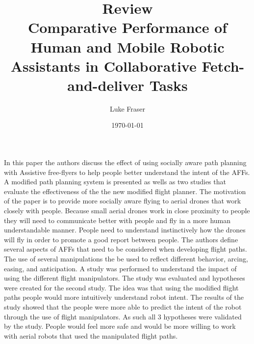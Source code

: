 \documentclass{article}
\begin{document}
\title{{\large Review} \\ Comparative Performance of Human and Mobile Robotic Assistants in Collaborative Fetch-and-deliver Tasks}
\author{Luke Fraser}
\date{\today}
\maketitle

\begingroup
\renewcommand{\section}[2]{}


\endgroup

\section*{Summary}
In this paper the authors discuss the effect of using socially aware path planning with Assistive free-flyers to help people better understand the intent of the AFFs. A modified path planning system is presented as wells as two studies that evaluate the effectiveness of the the new modified flight planner. The motivation of the paper is to provide more socially aware flying to aerial drones that work closely with people. Because small aerial drones work in close proximity to people they will need to communicate better with people and fly in a more human understandable manner. People need to understand instinctively how the drones will fly in order to promote a good report between people. The authors define several aspects of AFFs that need to be considered when developing flight paths. The use of several manipulations the be used to reflect different behavior, arcing, easing, and anticipation. A study was performed to understand the impact of using the different flight manipulators. The study was evaluated and hypotheses were created for the second study. The idea was that using the modified flight paths people would more intuitively understand robot intent. The results of the study showed that the people were more able to predict the intent of the robot through the use of flight manipulators. As such all 3 hypotheses were validated by the study. People would feel more safe and would be more willing to work with aerial robots that used the manipulated flight paths.
\end{document}
